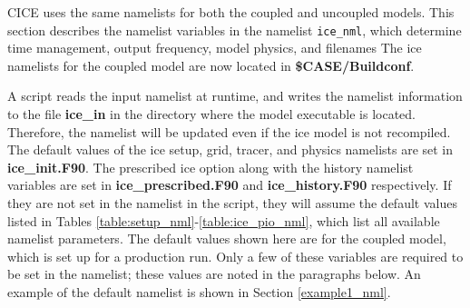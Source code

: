 
CICE uses the same namelists for both the coupled and uncoupled models.
This section describes the namelist variables in the namelist {\tt ice\_nml},
which determine time management, output frequency, model physics, and filenames
The ice namelists for the coupled model are now located in
{\bf \$CASE/Buildconf}.  

A script reads the input namelist at runtime, and writes the namelist
information to the file {\bf ice\_in} in the directory where the model 
executable is located.  Therefore, the namelist will be updated even if the 
ice model is not recompiled.  The default values of the ice setup, grid, 
tracer, and physics namelists are set in {\bf ice\_init.F90}.  The prescribed
ice option along with the history namelist variables are set
in {\bf ice\_prescribed.F90} and {\bf ice\_history.F90} respectively. 
If they are not set in the namelist 
in the script, they will assume the default values listed in 
Tables \ref{table:setup_nml}-\ref{table:ice_pio_nml}, which list all available 
namelist parameters.  The default values shown here are
for the coupled model, which is set up for a production run. Only a few of 
these variables are required to be set in the namelist; these values are 
noted in the paragraphs below.  An example of the default namelist is shown in 
Section \ref{example1_nml}.

